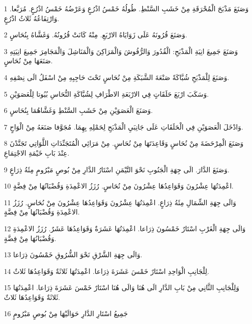 \par 1 وَصَنَعَ مَذْبَحَ الْمُحْرَقَةِ مِنْ خَشَبِ السَّنْطِ. طُولُهُ خَمْسُ اذْرُعٍ وَعَرْضُهُ خَمْسُ اذْرُعٍ. مُرَبَّعا. وَارْتِفَاعُهُ ثَلاثُ اذْرُعٍ.
\par 2 وَصَنَعَ قُرُونَهُ عَلَى زَوَايَاهُ الارْبَعِ. مِنْهُ كَانَتْ قُرُونُهُ. وَغَشَّاهُ بِنُحَاسٍ.
\par 3 وَصَنَعَ جَمِيعَ انِيَةِ الْمَذْبَحِ: الْقُدُورَ وَالرُّفُوشَ وَالْمَرَاكِنَ وَالْمَنَاشِلَ وَالْمَجَامِرَ جَمِيعَ انِيَتِهِ صَنَعَهَا مِنْ نُحَاسٍ.
\par 4 وَصَنَعَ لِلْمَذْبَحِ شُبَّاكَةً صَنْعَةَ الشَّبَكَةِ مِنْ نُحَاسٍ تَحْتَ حَاجِبِهِ مِنْ اسْفَلُ الَى نِصْفِهِ.
\par 5 وَسَكَبَ ارْبَعَ حَلَقَاتٍ فِي الارْبَعَةِ الاطْرَافِ لِشُبَّاكَةِ النُّحَاسِ بُيُوتا لِلْعَصَوَيْنِ.
\par 6 وَصَنَعَ الْعَصَوَيْنِ مِنْ خَشَبِ السَّنْطِ وَغَشَّاهُمَا بِنُحَاسٍ.
\par 7 وَادْخَلَ الْعَصَوَيْنِ فِي الْحَلَقَاتِ عَلَى جَانِبَيِ الْمَذْبَحِ لِحَمْلِهِ بِهِمَا. مُجَوَّفا صَنَعَهُ مِنْ الْوَاحٍ.
\par 8 وَصَنَعَ الْمِرْحَضَةَ مِنْ نُحَاسٍ وَقَاعِدَتَهَا مِنْ نُحَاسٍ. مِنْ مَرَائِي الْمُتَجَنِّدَاتِ اللَّوَاتِي تَجَنَّدْنَ عِنْدَ بَابِ خَيْمَةِ الاجْتِمَاعِ.
\par 9 وَصَنَعَ الدَّارَ. الَى جِهَةِ الْجَنُوبِ نَحْوَ التَّيْمَنِ اسْتَارُ الدَّارِ مِنْ بُوصٍ مَبْرُومٍ مِئَةُ ذِرَاعٍ.
\par 10 اعْمِدَتُهَا عِشْرُونَ وَقَوَاعِدُهَا عِشْرُونَ مِنْ نُحَاسٍ. رُزَزُ الاعْمِدَةِ وَقُضْبَانُهَا مِنْ فِضَّةٍ.
\par 11 وَالَى جِهَةِ الشِّمَالِ مِئَةُ ذِرَاعٍ. اعْمِدَتُهَا عِشْرُونَ وَقَوَاعِدُهَا عِشْرُونَ مِنْ نُحَاسٍ. رُزَزُ الاعْمِدَةِ وَقُضْبَانُهَا مِنْ فِضَّةٍ.
\par 12 وَالَى جِهَةِ الْغَرْبِ اسْتَارٌ خَمْسُونَ ذِرَاعا. اعْمِدَتُهَا عَشَرَةٌ وَقَوَاعِدُهَا عَشَرٌ. رُزَزُ الاعْمِدَةِ وَقُضْبَانُهَا مِنْ فِضَّةٍ.
\par 13 وَالَى جِهَةِ الشَّرْقِ نَحْوَ الشُّرُوقِ خَمْسُونَ ذِرَاعا.
\par 14 لِلْجَانِبِ الْوَاحِدِ اسْتَارٌ خَمْسَ عَشَرَةَ ذِرَاعا. اعْمِدَتُهَا ثَلاثَةٌ وَقَوَاعِدُهَا ثَلاثٌ.
\par 15 وَلِلْجَانِبِ الثَّانِي مِنْ بَابِ الدَّارِ الَى هُنَا وَالَى هُنَا اسْتَارٌ خَمْسَ عَشَرَةَ ذِرَاعا. اعْمِدَتُهَا ثَلاثَةٌ وَقَوَاعِدُهَا ثَلاثٌ.
\par 16 جَمِيعُ اسْتَارِ الدَّارِ حَوَالَيْهَا مِنْ بُوصٍ مَبْرُومٍ
